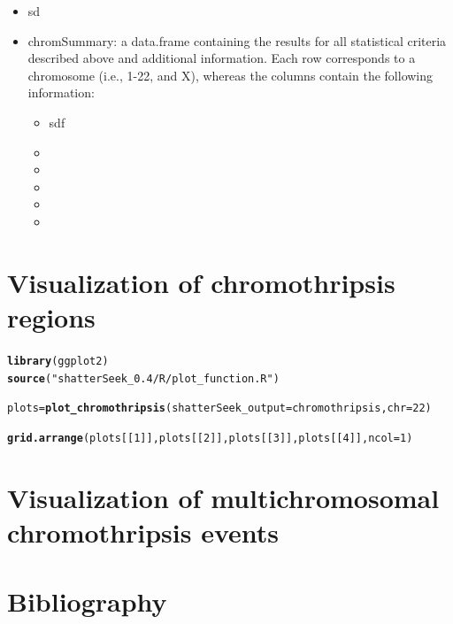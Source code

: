\documentclass[twoside,a4wide,11pt]{article}\usepackage[]{graphicx}\usepackage[]{color}
\makeatletter
\newcommand{\hlnum}[1]{\textcolor[rgb]{0.686,0.059,0.569}{#1}}%
\newcommand{\hlstr}[1]{\textcolor[rgb]{0.192,0.494,0.8}{#1}}%
\newcommand{\hlstd}[1]{\textcolor[rgb]{0.345,0.345,0.345}{#1}}%
\newcommand{\hlkwb}[1]{\textcolor[rgb]{0.69,0.353,0.396}{#1}}%
\newcommand{\hlkwc}[1]{\textcolor[rgb]{0.333,0.667,0.333}{#1}}%
\newcommand{\hlkwd}[1]{\textcolor[rgb]{0.737,0.353,0.396}{\textbf{#1}}}%
\newenvironment{kframe}{%
 \def\at@end@of@kframe{}%
 \ifinner\ifhmode%
  \def\at@end@of@kframe{\end{minipage}}%
  \begin{minipage}{\columnwidth}%
 \fi\fi%
 \def\FrameCommand##1{\hskip\@totalleftmargin \hskip-\fboxsep
 \colorbox{shadecolor}{##1}\hskip-\fboxsep
     \hskip-\linewidth \hskip-\@totalleftmargin \hskip\columnwidth}%
 \MakeFramed {\advance\hsize-\width
   \@totalleftmargin\z@ \linewidth\hsize
   \@setminipage}}%
 {\par\unskip\endMakeFramed%
 \at@end@of@kframe}
\newenvironment{knitrout}{}{} %
\makeatother
\begin{document}
\begin{itemize}
\item sd



\item chromSummary: a data.frame containing the results for all statistical criteria described above and additional information. 
Each row corresponds to a chromosome (i.e., 1-22, and X), whereas the columns contain the following information:
\begin{itemize}
\item sdf
\item
\item
\item
\item
\item
\end{itemize}
\end{itemize}





\section{Visualization of chromothripsis regions}

\begin{knitrout}
\color{fgcolor}\begin{kframe}
\begin{alltt}
\hlkwd{library}\hlstd{(ggplot2)}
\hlkwd{source}\hlstd{(}\hlstr{"shatterSeek_0.4/R/plot_function.R"}\hlstd{)}
\end{alltt}


{\ttfamily\noindent\bfseries{}}\begin{alltt}
\hlstd{plots} \hlkwb{=} \hlkwd{plot_chromothripsis}\hlstd{(}\hlkwc{shatterSeek_output} \hlstd{= chromothripsis,}\hlkwc{chr} \hlstd{=} \hlnum{22}\hlstd{)}
\end{alltt}


{\ttfamily\noindent\bfseries\color{errorcolor}{\#\# Error in plot\_chromothripsis(shatterSeek\_output = chromothripsis, chr = 22): object 'chromothripsis' not found}}\begin{alltt}
\hlkwd{grid.arrange}\hlstd{(plots[[}\hlnum{1}\hlstd{]],plots[[}\hlnum{2}\hlstd{]],plots[[}\hlnum{3}\hlstd{]],plots[[}\hlnum{4}\hlstd{]],}\hlkwc{ncol}\hlstd{=}\hlnum{1}\hlstd{)}
\end{alltt}


{\ttfamily\noindent\bfseries{}}\end{kframe}
\end{knitrout}


\section{Visualization of multichromosomal chromothripsis events}


\section{Bibliography}
\printbibliography
\end{document}
